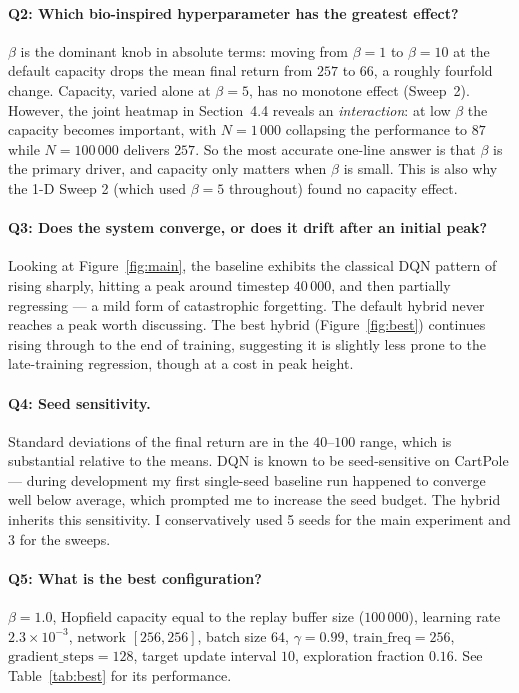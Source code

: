 \documentclass[a4paper,11pt]{article}
\begin{document}
\paragraph{Q2: Which bio-inspired hyperparameter has the greatest effect?}
$\beta$ is the dominant knob in absolute terms: moving from $\beta=1$
to $\beta=10$ at the default capacity drops the mean final return from
$257$ to $66$, a roughly fourfold change. Capacity, varied alone at
$\beta=5$, has no monotone effect (Sweep~2). However, the joint
heatmap in Section~4.4 reveals an \emph{interaction}: at low $\beta$
the capacity becomes important, with $N=1\,000$ collapsing the
performance to $87$ while $N=100\,000$ delivers $257$. So the most
accurate one-line answer is that $\beta$ is the primary driver, and
capacity only matters when $\beta$ is small. This is also why the
1-D Sweep 2 (which used $\beta=5$ throughout) found no capacity
effect.

\paragraph{Q3: Does the system converge, or does it drift after an initial peak?}
Looking at Figure~\ref{fig:main}, the baseline exhibits the classical
DQN pattern of rising sharply, hitting a peak around timestep $40\,000$,
and then partially regressing --- a mild form of catastrophic
forgetting. The default hybrid never reaches a peak worth discussing.
The best hybrid (Figure~\ref{fig:best}) continues rising through to the
end of training, suggesting it is slightly less prone to the late-training
regression, though at a cost in peak height.

\paragraph{Q4: Seed sensitivity.}
Standard deviations of the final return are in the $40$--$100$ range,
which is substantial relative to the means. DQN is known to be
seed-sensitive on CartPole --- during development my first single-seed
baseline run happened to converge well below average, which prompted
me to increase the seed budget. The hybrid inherits this sensitivity.
I conservatively used 5 seeds for the main experiment and 3 for the
sweeps.

\paragraph{Q5: What is the best configuration?}
$\beta=1.0$, Hopfield capacity equal to the replay buffer size
($100\,000$), learning rate $2.3\!\times\!10^{-3}$, network
$[256, 256]$, batch size $64$, $\gamma=0.99$, $\mathrm{train\_freq}=256$,
$\mathrm{gradient\_steps}=128$, target update interval $10$, exploration
fraction $0.16$. See Table~\ref{tab:best} for its performance.
\end{document}

